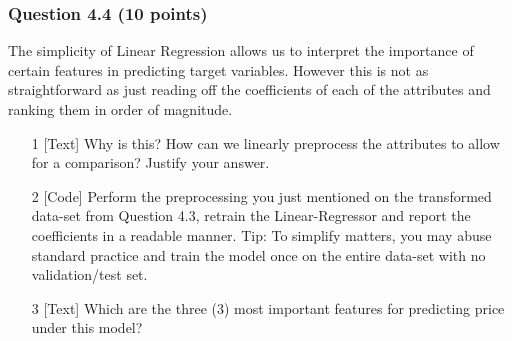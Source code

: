 \documentclass[12pt]{article}
\begin{document}




\subsubsection*{Question 4.4 (10 points)}
The simplicity of Linear Regression allows us to interpret the importance of certain features in predicting target variables. However this is not as straightforward as just reading off the coefficients of each of the attributes and ranking them in order of magnitude.

\begin{enumerate}
    \item[1] [Text] Why is this? How can we linearly preprocess the attributes to allow for a comparison? Justify your answer.
    \item[2] [Code] Perform the preprocessing you just mentioned on the transformed data-set from Question 4.3, retrain the Linear-Regressor and report the coefficients in a readable manner. Tip: To simplify matters, you may abuse standard practice and train the model once on the entire data-set with no validation/test set.
    \item[3] [Text] Which are the three (3) most important features for predicting price under this model?
\end{enumerate}

\end{document}
